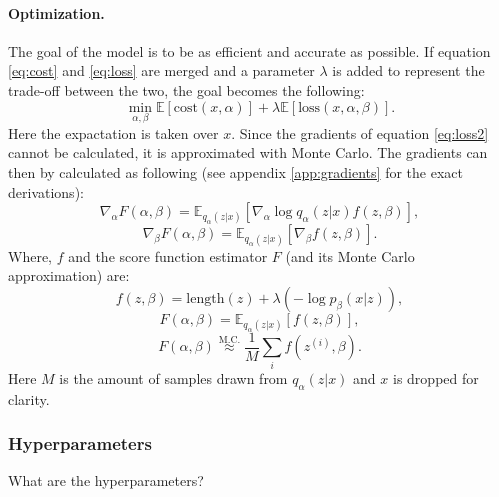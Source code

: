 \documentclass[a4paper, 12pt]{report}
\newcommand{\approxtext}[1]{\ensuremath{\stackrel{\text{#1}}{\approx}}}
\begin{document}
\paragraph{Optimization.} 
The goal of the model is to be as efficient and accurate as possible. 
If equation \ref{eq:cost} and \ref{eq:loss} are merged and a parameter $\lambda$ is added to represent the trade-off between the two, the goal becomes the following:
\begin{equation}
    \label{eq:loss2}
    \min_{\alpha, \beta} \mathbb{E} [\text{cost}(x, \alpha)] + \lambda \mathbb{E}[\text{loss}(x, \alpha, \beta)].
\end{equation}
Here the expactation is taken over $x$. 
Since the gradients of equation \ref{eq:loss2} cannot be calculated, it is approximated with Monte Carlo.
The gradients can then by calculated as following (see appendix \ref{app:gradients} for the exact derivations):
\begin{equation}
    \label{eq:gradient_alpha}
    \nabla_\alpha F(\alpha, \beta) = \mathbb{E}_{q_{\alpha}(z|x)} [\nabla_{\alpha} \log q_{\alpha}(z|x) f(z, \beta)],
\end{equation}
\begin{equation}
    \label{eq:gradient_beta}
    \nabla_\beta F(\alpha, \beta) = \mathbb{E}_{q_{\alpha}(z|x)} [\nabla_{\beta} f (z, \beta)].
\end{equation}
Where, $f$ and the score function estimator $F$ (and its Monte Carlo approximation) are:
\begin{equation}
    \label{eq:f}
    f(z, \beta) = \text{length}(z) + \lambda (-\log p_{\beta}(x|z)),
\end{equation}
\begin{equation}
    \label{eq:F}
    F (\alpha, \beta) = \mathbb{E}_{q_{\alpha}(z|x)} [f(z, \beta)],
\end{equation}
\begin{equation}
    \label{eq:F_approx}
    F (\alpha, \beta) \approxtext{M.C.} \frac{1}{M} \sum_i f (z^{(i)}, \beta).
\end{equation}
Here $M$ is the amount of samples drawn from $q_{\alpha}(z|x)$ and $x$ is dropped for clarity.

\subsubsection{Hyperparameters}
What are the hyperparameters?
\end{document}
